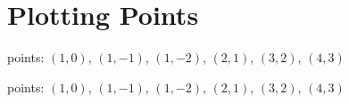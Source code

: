 \section{Plotting Points}

\begin{myWideProblemWithContent}
    points: $(1,0)$, $(1,-1)$, $(1,-2)$, $(2,1)$, $(3,2)$, $(4,3)$

\end{myWideProblemWithContent}

\begin{myWideProblemWithContent}[xxx]
    points: $(1,0)$, $(1,-1)$, $(1,-2)$, $(2,1)$, $(3,2)$, $(4,3)$

\end{myWideProblemWithContent}
